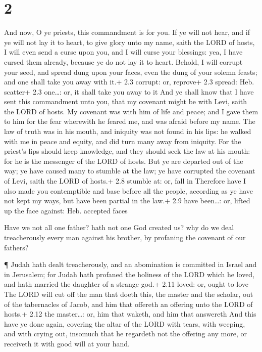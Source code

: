 \hypertarget{section-1}{%
\section{2}\label{section-1}}

 And now, O ye priests, this commandment is for you.
 If ye will not hear, and if ye will not lay it to heart, to
give glory unto my name, saith the LORD of hosts, I will even send a
curse upon you, and I will curse your blessings: yea, I have cursed them
already, because ye do not lay it to heart.  Behold, I will
corrupt your seed, and spread dung upon your faces, even the dung of
your solemn feasts; and one shall take you away with it.+ 2.3 corrupt:
or, reprove+ 2.3 spread: Heb. scatter+ 2.3 one\ldots: or, it shall take
you away to it  And ye shall know that I have sent this
commandment unto you, that my covenant might be with Levi, saith the
LORD of hosts.  My covenant was with him of life and peace;
and I gave them to him for the fear wherewith he feared me, and was
afraid before my name.  The law of truth was in his mouth,
and iniquity was not found in his lips: he walked with me in peace and
equity, and did turn many away from iniquity.  For the
priest's lips should keep knowledge, and they should seek the law at his
mouth: for he is the messenger of the LORD of hosts.  But ye
are departed out of the way; ye have caused many to stumble at the law;
ye have corrupted the covenant of Levi, saith the LORD of hosts.+ 2.8
stumble at: or, fall in  Therefore have I also made you
contemptible and base before all the people, according as ye have not
kept my ways, but have been partial in the law.+ 2.9 have been\ldots:
or, lifted up the face against: Heb. accepted faces

 Have we not all one father? hath not one God created us?
why do we deal treacherously every man against his brother, by profaning
the covenant of our fathers?

 ¶ Judah hath dealt treacherously, and an abomination is
committed in Israel and in Jerusalem; for Judah hath profaned the
holiness of the LORD which he loved, and hath married the daughter of a
strange god.+ 2.11 loved: or, ought to love  The LORD will
cut off the man that doeth this, the master and the scholar, out of the
tabernacles of Jacob, and him that offereth an offering unto the LORD of
hosts.+ 2.12 the master\ldots: or, him that waketh, and him that
answereth  And this have ye done again, covering the altar
of the LORD with tears, with weeping, and with crying out, insomuch that
he regardeth not the offering any more, or receiveth it with good will
at your hand.

